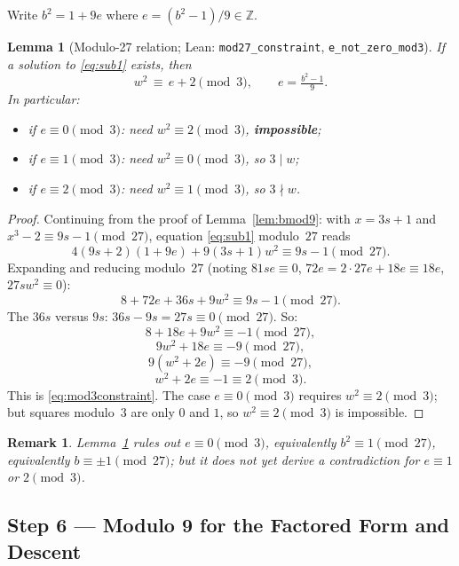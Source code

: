 \documentclass[12pt,a4paper]{article}
\newtheorem{lemma}[theorem]{Lemma}
\newtheorem{remark}{Remark}
\begin{document}
Write $b^2 = 1 + 9e$ where $e = (b^2-1)/9 \in \mathbb{Z}$.

\begin{lemma}[Modulo-27 relation; Lean: \texttt{mod27\_constraint}, \texttt{e\_not\_zero\_mod3}]\label{lem:mod27}
If a solution to \eqref{eq:sub1} exists, then
\begin{equation}\label{eq:mod3constraint}
  w^2 \,\equiv\, e + 2 \pmod 3, \qquad e = \tfrac{b^2-1}{9}.
\end{equation}
In particular:
\begin{itemize}
  \item if $e \equiv 0 \pmod 3$: need $w^2 \equiv 2 \pmod 3$, \textbf{impossible};
  \item if $e \equiv 1 \pmod 3$: need $w^2 \equiv 0 \pmod 3$, so $3 \mid w$;
  \item if $e \equiv 2 \pmod 3$: need $w^2 \equiv 1 \pmod 3$, so $3 \nmid w$.
\end{itemize}
\end{lemma}

\begin{proof}
Continuing from the proof of Lemma~\ref{lem:bmod9}: with $x=3s+1$ and $x^3
- 2 \equiv 9s-1 \pmod{27}$, equation \eqref{eq:sub1} modulo~$27$ reads
\[
  4(9s+2)(1+9e) + 9(3s+1)w^2 \equiv 9s-1 \pmod{27}.
\]
Expanding and reducing modulo~$27$ (noting $81se \equiv 0$, $72e = 2\cdot
27e + 18e \equiv 18e$, $27sw^2 \equiv 0$):
\[
  8 + 72e + 36s + 9w^2 \equiv 9s-1 \pmod{27}.
\]
The $36s$ versus $9s$: $36s - 9s = 27s \equiv 0 \pmod{27}$. So:
\[
  8 + 18e + 9w^2 \equiv -1 \pmod{27},
\]
\[
  9w^2 + 18e \equiv -9 \pmod{27},
\]
\[
  9(w^2 + 2e) \equiv -9 \pmod{27},
\]
\[
  w^2 + 2e \equiv -1 \equiv 2 \pmod 3.
\]
This is \eqref{eq:mod3constraint}. The case $e \equiv 0 \pmod 3$ requires
$w^2 \equiv 2 \pmod 3$; but squares modulo~$3$ are only $0$ and $1$, so
$w^2 \equiv 2 \pmod 3$ is impossible.
\end{proof}

\begin{remark}
Lemma~\ref{lem:mod27} rules out $e\equiv 0\pmod 3$, equivalently $b^2 \equiv
1 \pmod{27}$, equivalently $b \equiv \pm 1 \pmod{27}$; but it does \emph{not}
yet derive a contradiction for $e \equiv 1$ or $2 \pmod 3$.
\end{remark}

\subsection{Step 6 --- Modulo 9 for the Factored Form and Descent}
\end{document}
